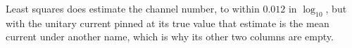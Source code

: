 
Least squares does estimate the channel number, to within $0.012$ in $\log_{10}$, but with the unitary
current pinned at its true value that estimate is the mean current under another name, which is why
its other two columns are empty.

